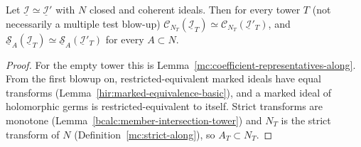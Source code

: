 \begin{lemma}
\label{mc:coefficient-representatives-tower}
\leanok
Let \(\underline{\mathcal I}\simeq\underline{\mathcal I}'\) with \(N\) closed and coherent ideals. Then for every tower \(T\) (not necessarily a multiple test blow-up)
\(\mathcal C_{N_T}(\underline{\mathcal I}_T)\simeq\mathcal C_{N_T}(\underline{\mathcal I}'_T)\), and \(\underline{\mathcal S}_A(\underline{\mathcal I}_T)\simeq\underline{\mathcal S}_A(\underline{\mathcal I}'_T)\) for every
\(A\subset N\).
\end{lemma}
\begin{proof}
\leanok
For the empty tower this is Lemma~\ref{mc:coefficient-representatives-along}. From the first blowup on, restricted-equivalent marked ideals have equal transforms
(Lemma~\ref{hir:marked-equivalence-basic}), and a marked ideal of holomorphic germs is restricted-equivalent to itself. Strict transforms are monotone
(Lemma~\ref{bcalc:member-intersection-tower}) and \(N_T\) is the strict transform of \(N\) (Definition~\ref{mc:strict-along}), so \(A_T\subset N_T\).
\end{proof}


